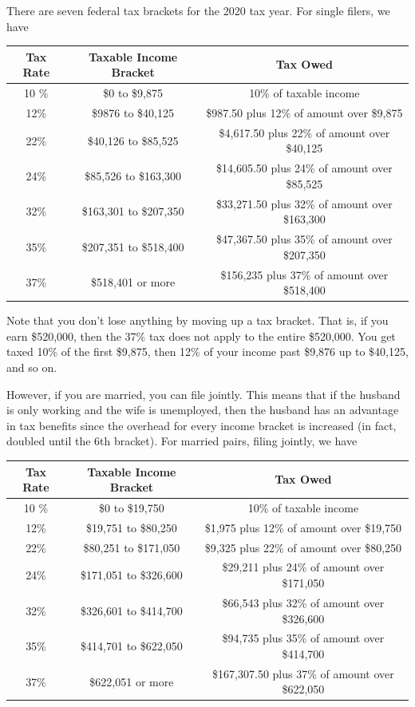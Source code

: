 \documentclass{article}
\begin{document}
    \begin{example}
      \label{ex:2020-u-s-tax-brackets}
      There are seven federal tax brackets for the 2020 tax year. For single filers, we have
      \begin{center}
      \begin{tabular}{c|c|c}
        Tax Rate & Taxable Income Bracket & Tax Owed \\
        \hline
        10 \% & \$0 to \$9,875 & 10\% of taxable income \\
        12\% & \$9876 to \$40,125 & \$987.50 plus 12\% of amount over \$9,875\\
        22\% & \$40,126 to \$85,525 & \$4,617.50 plus 22\% of amount over \$40,125\\
        24\% & \$85,526 to \$163,300 & \$14,605.50 plus 24\% of amount over \$85,525\\
        32\% & \$163,301 to \$207,350 & \$33,271.50 plus 32\% of amount over \$163,300\\
        35\% & \$207,351 to \$518,400 & \$47,367.50 plus 35\% of amount over \$207,350\\
        37\% & \$518,401 or more & \$156,235 plus 37\% of amount over \$518,400
      \end{tabular}
      \end{center}
      Note that you don't lose anything by moving up a tax bracket. That is, if you earn \$520,000, then the 37\% tax does not apply to the entire \$520,000. You get taxed 10\% of the first \$9,875, then 12\% of your income past \$9,876 up to \$40,125, and so on. 

      However, if you are married, you can file jointly. This means that if the husband is only working and the wife is unemployed, then the husband has an advantage in tax benefits since the overhead for every income bracket is increased (in fact, doubled until the 6th bracket). For married pairs, filing jointly, we have 
      \begin{center}
      \begin{tabular}{c|c|c}
        Tax Rate & Taxable Income Bracket & Tax Owed \\
        \hline
        10 \% & \$0 to \$19,750 & 10\% of taxable income \\
        12\% & \$19,751 to \$80,250 & \$1,975 plus 12\% of amount over \$19,750\\
        22\% & \$80,251 to \$171,050 & \$9,325 plus 22\% of amount over \$80,250\\
        24\% & \$171,051 to \$326,600 & \$29,211 plus 24\% of amount over \$171,050\\
        32\% & \$326,601 to \$414,700 & \$66,543 plus 32\% of amount over \$326,600\\
        35\% & \$414,701 to \$622,050 & \$94,735 plus 35\% of amount over \$414,700\\
        37\% & \$622,051 or more & \$167,307.50 plus 37\% of amount over \$622,050
      \end{tabular}
      \end{center}
    \end{example}
\end{document}

